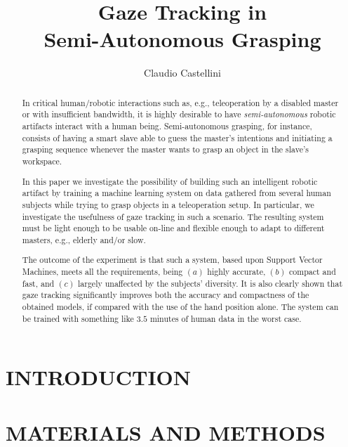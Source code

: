\documentclass{article}
\title{\LARGE \bf Gaze Tracking in\\ Semi-Autonomous Grasping}
\author{Claudio Castellini}
\date{}
\begin{document}
\maketitle

\begin{abstract}

In critical human/robotic interactions such as, e.g., teleoperation by
a disabled master or with insufficient bandwidth, it is highly
desirable to have \emph{semi-autonomous} robotic artifacts interact
with a human being. Semi-autonomous grasping, for instance, consists
of having a smart slave able to guess the master's intentions and
initiating a grasping sequence whenever the master wants to grasp an
object in the slave's workspace.

In this paper we investigate the possibility of building such an
intelligent robotic artifact by training a machine learning system on
data gathered from several human subjects while trying to grasp
objects in a teleoperation setup. In particular, we investigate the
usefulness of gaze tracking in such a scenario. The resulting system
must be light enough to be usable on-line and flexible enough to adapt
to different masters, e.g., elderly and/or slow.

The outcome of the experiment is that such a system, based upon
Support Vector Machines, meets all the requirements, being $(a)$
highly accurate, $(b)$ compact and fast, and $(c)$ largely unaffected
by the subjects' diversity. It is also clearly shown that gaze
tracking significantly improves both the accuracy and compactness of
the obtained models, if compared with the use of the hand position
alone. The system can be trained with something like $3.5$ minutes of
human data in the worst case.

\end{abstract}

\section{INTRODUCTION}
\label{sec:intro}


\section{MATERIALS AND METHODS}
\label{sec:matmet}

\end{document}

